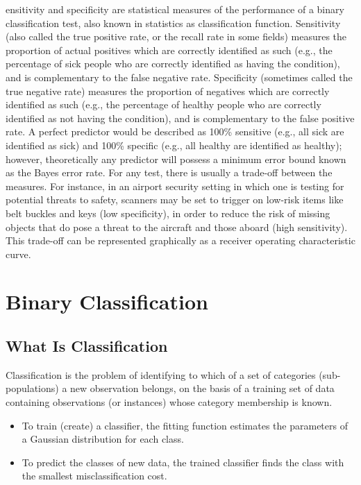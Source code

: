 \documentclass[12pt]{article}
\begin{document}
ensitivity and specificity are statistical measures of the performance of a binary classification test, also known in statistics as classification function. Sensitivity (also called the true positive rate, or the recall rate in some fields) measures the proportion of actual positives which are correctly identified as such (e.g., the percentage of sick people who are correctly identified as having the condition), and is complementary to the false negative rate. Specificity (sometimes called the true negative rate) measures the proportion of negatives which are correctly identified as such (e.g., the percentage of healthy people who are correctly identified as not having the condition), and is complementary to the false positive rate.
A perfect predictor would be described as 100\% sensitive (e.g., all sick are identified as sick) and 100\% specific (e.g., all healthy are identified as healthy); however, theoretically any predictor will possess a minimum error bound known as the Bayes error rate.
For any test, there is usually a trade-off between the measures. For instance, in an airport security setting in which one is testing for potential threats to safety, scanners may be set to trigger on low-risk items like belt buckles and keys (low specificity), in order to reduce the risk of missing objects that do pose a threat to the aircraft and those aboard (high sensitivity). This trade-off can be represented graphically as a receiver operating characteristic curve.


\newpage
\section*{Binary Classification}
\subsection*{What Is Classification}
Classification is the problem of identifying to which of a set of categories
(sub-populations) a new observation belongs, on the basis of a training set
of data containing observations (or instances) whose category membership is
known. 

\begin{itemize}
\item  To train (create) a classifier, the fitting function estimates the parameters
of a Gaussian distribution for each class.
\item  To predict the classes of new data, the trained classifier finds the class
with the smallest misclassification cost.
\end{itemize}
\end{document}
